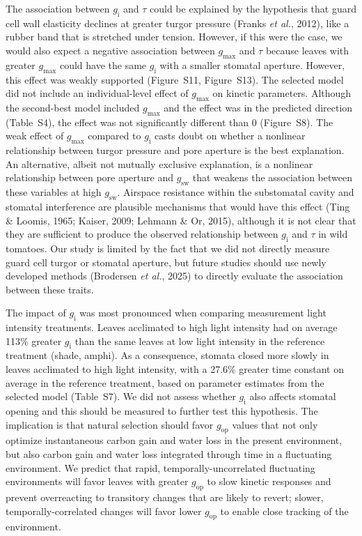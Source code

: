 \documentclass[
  letterpaper,
  DIV=11,
  numbers=noendperiod]{scrartcl}
\newcommand{\gi}{$g_\mathrm{i}$}
\newcommand{\gmax}{$g_\mathrm{max}$}
\newcommand{\gop}{$g_\mathrm{op}$}
\newcommand{\gsw}{$g_\mathrm{sw}$}
\begin{document}
The association between \gi{} and \(\tau\) could be explained by the
hypothesis that guard cell wall elasticity declines at greater turgor
pressure (Franks \emph{et al.}, 2012), like a rubber band that is
stretched under tension. However, if this were the case, we would also
expect a negative association between \gmax{} and \(\tau\) because
leaves with greater \gmax{} could have the same \gi{} with a smaller
stomatal aperture. However, this effect was weakly supported
(Figure~S11, Figure~S13). The selected
model did not include an individual-level effect of \gmax{} on kinetic
parameters. Although the second-best model included \gmax{} and the
effect was in the predicted direction (Table~S4), the
effect was not significantly different than 0
(Figure~S8). The weak effect of \gmax{} compared to
\gi{} casts doubt on whether a nonlinear relationship between turgor
pressure and pore aperture is the best explanation. An alternative,
albeit not mutually exclusive explanation, is a nonlinear relationship
between pore aperture and \gsw{} that weakens the association between
these variables at high \gsw. Airspace resistance within the substomatal
cavity and stomatal interference are plausible mechanisms that would
have this effect (Ting \& Loomis, 1965; Kaiser, 2009; Lehmann \& Or,
2015), although it is not clear that they are sufficient to produce the
observed relationship between \gi{} and \(\tau\) in wild tomatoes. Our
study is limited by the fact that we did not directly measure guard cell
turgor or stomatal aperture, but future studies should use newly
developed methods (Brodersen \emph{et al.}, 2025) to directly evaluate
the association between these traits.

The impact of \gi{} was most pronounced when comparing measurement light
intensity treatments. Leaves acclimated to high light intensity had on
average 113\% greater \gi{} than the same leaves at low light intensity
in the reference treatment (shade, amphi). As a consequence, stomata
closed more slowly in leaves acclimated to high light intensity, with a
27.6\% greater time constant on average in the reference treatment,
based on parameter estimates from the selected model
(Table~S7). We did not assess whether \gi{} also affects
stomatal opening and this should be measured to further test this
hypothesis. The implication is that natural selection should favor
\gop{} values that not only optimize instantaneous carbon gain and water
loss in the present environment, but also carbon gain and water loss
integrated through time in a fluctuating environment. We predict that
rapid, temporally-uncorrelated fluctuating environments will favor
leaves with greater \gop{} to slow kinetic responses and prevent
overreacting to transitory changes that are likely to revert; slower,
temporally-correlated changes will favor lower \gop{} to enable close
tracking of the environment.
\end{document}
